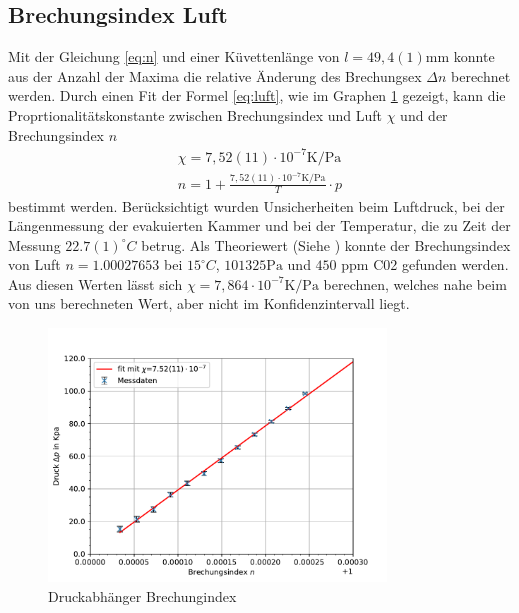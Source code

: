 \documentclass[11pt, a4paper]{article}
\begin{document}
   
    \subsection{Brechungsindex Luft}
    Mit der Gleichung \ref{eq:n} und einer Küvettenlänge von $l = 49,4(1) \si{\milli\metre}$ konnte aus der Anzahl der Maxima die relative Änderung des Brechungsex $\Delta n$ berechnet werden.
    Durch einen Fit der Formel \ref{eq:luft}, wie im Graphen \ref{fig:druck} gezeigt, kann die Proprtionalitätskonstante zwischen Brechungsindex und Luft $\chi$ und der Brechungsindex $n$
    \begin{align}
        \chi = 7,52(11) \cdot 10^{-7} \si{\kelvin\per\pascal} \\
        n = 1 + \frac{7,52(11) \cdot 10^{-7} \si{\kelvin\per\pascal}}{T} \cdot p
    \end{align}
    bestimmt werden. Berücksichtigt wurden Unsicherheiten beim Luftdruck, bei der Längenmessung der evakuierten Kammer und bei der Temperatur, die zu Zeit der Messung $22.7(1) ^{\circ}C$ betrug. Als Theoriewert (Siehe \cite{theoluft}) konnte der Brechungsindex von Luft $n = 1.00027653$ bei $15 ^{\circ}C$, $101325 \si{\pascal}$ und $450$ ppm C02 gefunden werden. Aus diesen Werten lässt sich $\chi = 7,864 \cdot 10^{-7}  \si{\kelvin\per\pascal}$ berechnen, welches nahe beim von uns berechneten Wert, aber nicht im Konfidenzintervall liegt.
    
    \begin{figure}
        \centering
        \includegraphics[width=0.8\textwidth]{./plots/druck.pdf}
        \caption{Druckabhänger Brechungindex}
        \label{fig:druck}
    \end{figure}
\end{document}
